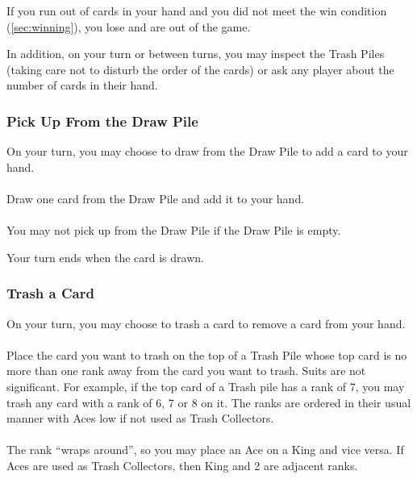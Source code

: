 \documentclass{article}
\begin{document}
If you run out of cards in your hand and you did not meet the win condition (\autoref{sec:winning}), you lose and are out of the game.

In addition, on your turn or between turns, you may inspect the Trash Piles (taking care not to disturb the order of the cards) or ask any player about the number of cards in their hand.

\subsubsection{Pick Up From the Draw Pile}
\label{sec:draw}

On your turn, you may choose to draw from the Draw Pile to add a card to your hand.

\paragraph{} \label{par:drawnormal}
Draw one card from the Draw Pile and add it to your hand.

\paragraph{} \label{par:drawempty}
You may not pick up from the Draw Pile if the Draw Pile is empty.

Your turn ends when the card is drawn.

\subsubsection{Trash a Card}
\label{sec:trashcard}

On your turn, you may choose to trash a card to remove a card from your hand.

\paragraph{} \label{par:trashvalid}
Place the card you want to trash on the top of a Trash Pile whose top card is no more than one rank away from the card you want to trash. Suits are not significant. For example, if the top card of a Trash pile has a rank of 7, you may trash any card with a rank of 6, 7 or 8 on it.
The ranks are ordered in their usual manner with Aces low if not used as Trash Collectors.

\paragraph{} \label{par:trashwraparound}
The rank ``wraps around'', so you may place an Ace on a King and vice versa. If Aces are used as Trash Collectors, then King and 2 are adjacent ranks.
\end{document}
